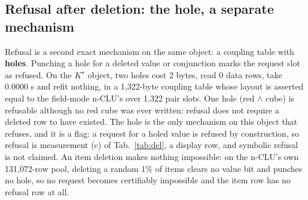 \documentclass{article} %
\newcommand{\Kstar}{\ensuremath{K^{\star}}}
\begin{document}
\subsection{Refusal after deletion: the hole, a separate mechanism}
\label{sec:hole}

Refusal is a second exact mechanism on the same object: a coupling table with \textbf{holes}.
Punching a hole for a deleted value or conjunction marks the request slot as refused. On the
$\Kstar$ object, two holes cost 2 bytes, read 0 data rows, take 0.0000 s and refit nothing, in
a 1,322-byte coupling table whose layout is asserted equal to the field-mode n-CLU's over 1,322 pair
slots. %
One hole (red $\wedge$ cube) is refusable although no red cube was ever written: refusal does
not require a deleted row to have existed. %
The hole is the only mechanism on this object that refuses, and it is a flag: a request for a
holed value is refused by construction, so refusal is measurement (c) of Tab.~\ref{tab:del}, a
display row, and symbolic refusal is not claimed. An item deletion makes nothing impossible: on the n-CLU's own 131,072-row pool, deleting a random
1\% of items clears no value bit and punches no hole, so no request becomes certifiably impossible
and the item row has no refusal row at all. %
\end{document}
